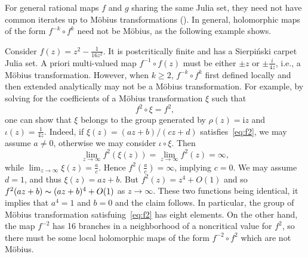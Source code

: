 \documentclass[12pt]{amsart}
\makeatletter
\newtheorem*{ex}{Example}
\newcommand{\N}{\mathbb{N}}
\newcommand{\J}{\mathcal{J}}
\renewenvironment{ex}[1][\examplename]{%
  \par
  \pushQED{\qed}%
  \normalfont\topsep6\p@ \@plus6\p@ \trivlist
  \item[\hskip\labelsep\itshape
        \bfseries #1\@addpunct{:}]%
  \ignorespaces
}{%
  \popQED\endtrivlist
}
\renewenvironment{ex}{%
  \normalfont\topsep6\p@ \@plus6\p@ \trivlist
  \item[\hskip\labelsep\bfseries Example:]%
  \ignorespaces
}{%
  \endtrivlist
}
\makeatother
\begin{document}
For general rational maps $f$ and $g$ sharing the same Julia set, they need not have common iterates up to  M\"obius transformations (\cite[Theorem 1.1]{Ye}). 
In general, holomorphic maps of the form $f^{-k}\circ f^k$ need not be M\"obius, as the following example shows. 
\begin{ex}\label{ex:simple}
  Consider $f(z)=z^2-\frac{1}{16z^2}$. It is postcritically finite and has a Sierpi\'nski carpet Julia set. A priori multi-valued map $f^{-1}\circ f(z)$ must be either $\pm z$ or $\pm \frac{i}{4z}$, i.e., a M\"obius transformation. 
  However, when $k\geq 2$, $f^{-k}\circ f^k$ first defined locally and then extended analytically may not be a M\"obius transformation. For example, by solving for the coefficients of a M\"obius transformation $\xi$ such that 
  \begin{equation}\label{eq:f2}
  	f^2\circ \xi=f^2,
  \end{equation}
  one can show that $\xi$ belongs to the group generated by $\rho(z)=\mathrm{i}z$ and $\iota(z)=\frac{1}{4z}$. 
  Indeed, if $\xi(z)={(az+b)}/{(cz+d)}$ satisfies~\eqref{eq:f2}, we may assume $a\neq 0$, otherwise we may consider $\iota\circ \xi$. Then 
  $$\lim_{z \to \infty}f^2(\xi(z))=\lim_{z \to \infty}f^2(z)=\infty,$$ while $\lim_{z \to \infty}\xi(z)=\frac{a}{c}$. Hence $f^2(\frac{a}{c})=\infty$, implying $c=0$. We may assume $d=1$, and thus $\xi(z)=az+b$. But $f^2(z)=z^4+O(1)$ and so $f^2(az+b)\thicksim (az+b)^4+O(1)$ as $z\to \infty$. These two functions being identical, it implies that $a^4=1$ and $b=0$ and the claim follows. In particular, the group of M\"obius transformation satisfuing~\eqref{eq:f2} has eight elements. On the other hand, the map $f^{-2}$ has 16 branches in a neighborhood of a noncritical value for $f^2$, so there must be some local 
  holomorphic maps of the form $f^{-2}\circ f^2$ which are not M\"obius.   
\end{ex}
\end{document}
